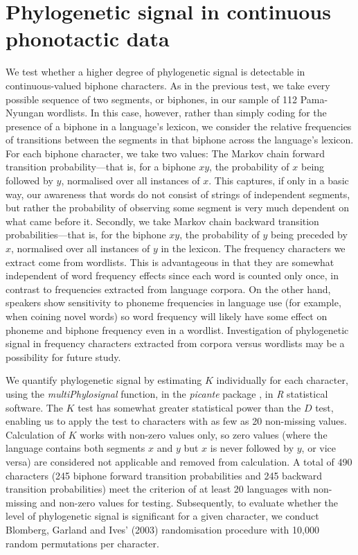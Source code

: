 \hypertarget{phy-sig-cont}{%
\section{Phylogenetic signal in continuous phonotactic data}\label{phy-sig-cont}}

We test whether a higher degree of phylogenetic signal is detectable in continuous-valued biphone characters. As in the previous test, we take every possible sequence of two segments, or biphones, in our sample of 112 Pama-Nyungan wordlists. In this case, however, rather than simply coding for the presence of a biphone in a language's lexicon, we consider the relative frequencies of transitions between the segments in that biphone across the language's lexicon. For each biphone character, we take two values: The Markov chain forward transition probability---that is, for a biphone \(xy\), the probability of \(x\) being followed by \(y\), normalised over all instances of \(x\). This captures, if only in a basic way, our awareness that words do not consist of strings of independent segments, but rather the probability of observing some segment is very much dependent on what came before it. Secondly, we take Markov chain backward transition probabilities---that is, for the biphone \(xy\), the probability of \(y\) being preceded by \(x\), normalised over all instances of \(y\) in the lexicon. The frequency characters we extract come from wordlists. This is advantageous in that they are somewhat independent of word frequency effects since each word is counted only once, in contrast to frequencies extracted from language corpora. On the other hand, speakers show sensitivity to phoneme frequencies in language use (for example, when coining novel words) \autocites{coleman_stochastic_1997}{zuraw_patterned_2000}{ernestus_predicting_2003}{albright_rules_2003}{eddington_spanish_2004}{hayes_stochastic_2006}{gordon_phonological_2016} so word frequency will likely have some effect on phoneme and biphone frequency even in a wordlist. Investigation of phylogenetic signal in frequency characters extracted from corpora versus wordlists may be a possibility for future study.

We quantify phylogenetic signal by estimating \(K\) \autocite{blomberg_testing_2003} individually for each character, using the \emph{multiPhylosignal} function, in the \emph{picante} package \autocite{kembel_picante:_2010}, in \emph{R} statistical software. The \(K\) test has somewhat greater statistical power than the \(D\) test, enabling us to apply the test to characters with as few as 20 non-missing values. Calculation of \(K\) works with non-zero values only, so zero values (where the language contains both segments \(x\) and \(y\) but \(x\) is never followed by \(y\), or vice versa) are considered not applicable and removed from calculation. A total of 490 characters (245 biphone forward transition probabilities and 245 backward transition probabilities) meet the criterion of at least 20 languages with non-missing and non-zero values for testing. Subsequently, to evaluate whether the level of phylogenetic signal is significant for a given character, we conduct Blomberg, Garland and Ives' (2003) randomisation procedure with 10,000 random permutations per character.

